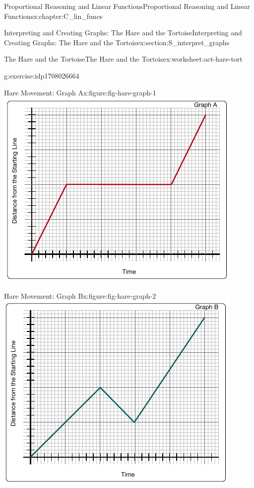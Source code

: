 \documentclass[oneside,10pt,]{book}
\numberwithin{equation}{chapter}
\begin{document}
\begin{chapterptx}{Proportional Reasoning and Linear Functions}{}{Proportional Reasoning and Linear Functions}{}{}{x:chapter:C_lin_funcs}
\begin{sectionptx}{Interpreting and Creating Graphs: The Hare and the Tortoise}{}{Interpreting and Creating Graphs: The Hare and the Tortoise}{}{}{x:section:S_interpret_graphs}
\begin{worksheet-subsection}{The Hare and the Tortoise}{}{The Hare and the Tortoise}{}{}{x:worksheet:act-hare-tort}
\begin{divisionexercise}{2}{}{}{g:exercise:idp1708026664}
\begin{sidebyside}{2}{0}{0}{0}
\begin{sbspanel}{0.5}
\begin{figureptx}{Hare Movement: Graph A}{x:figure:fig-hare-graph-1}{}
\includegraphics[width=\linewidth]{external/hare-graph-1.pdf}
\tcblower
\end{figureptx}%
\end{sbspanel}%
\begin{sbspanel}{0.5}%
\begin{figureptx}{Hare Movement: Graph B}{x:figure:fig-hare-graph-2}{}%
\includegraphics[width=\linewidth]{external/hare-graph-2.pdf}
\tcblower
\end{figureptx}%
\end{sbspanel}%
\end{sidebyside}%

\end{divisionexercise}
\end{worksheet-subsection}
\end{sectionptx}
\end{chapterptx}
\end{document}
